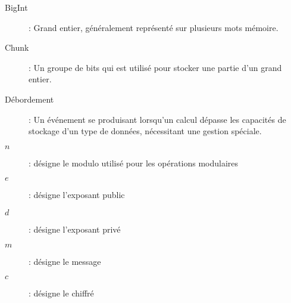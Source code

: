 \begin{description}
    \item[BigInt] : Grand entier, généralement représenté sur plusieurs mots mémoire.
    \item[Chunk] : Un groupe de bits qui est utilisé pour stocker une partie d'un grand entier.
    \item[Débordement] : Un événement se produisant lorsqu'un calcul dépasse les capacités de stockage d'un type de données, nécessitant une gestion spéciale.
\end{description}
    \hrulefill
\begin{description}
    \item[$n$] : désigne le modulo utilisé pour les opérations modulaires
    \item[$e$] : désigne l'exposant public
    \item[$d$] : désigne l'exposant privé
    \item[$m$] : désigne le message
    \item[$c$] : désigne le chiffré
\end{description}

